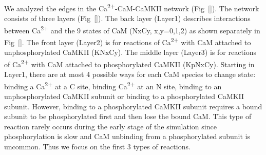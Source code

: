 \documentclass[10pt,letterpaper]{article}
\begin{document}
We analyzed the edges in the Ca\textsuperscript{2+}-CaM-CaMKII network (Fig~\ref{}). The network consists of three layers (Fig~\ref{}). The back layer (Layer1) describes interactions between Ca\textsuperscript{2+} and the 9 states of CaM (NxCy, x,y=0,1,2) as shown separately in Fig~\ref{}. The front layer (Layer2) is for reactions of Ca\textsuperscript{2+} with CaM attached to unphosphorylated CaMKII (KNxCy). The middle layer (Layer3) is for reactions of Ca\textsuperscript{2+} with CaM attached to phosphorylated CaMKII (KpNxCy). Starting in Layer1, there are at most 4 possible ways for each CaM species to change state: binding a Ca\textsuperscript{2+} at a C site, binding Ca\textsuperscript{2+} at an N site, binding to an unphosphorylated CaMKII subunit or binding to a phosphorylated CaMKII subunit. However, binding to a phosphorylated CaMKII subunit requires a bound subunit to be phosphorylated first and then lose the bound CaM. This type of reaction rarely occurs during the early stage of the simulation since phosphorylation is slow and CaM unbinding from a phosphorylated subunit is uncommon. Thus we focus on the first 3 types of reactions.
\end{document}
